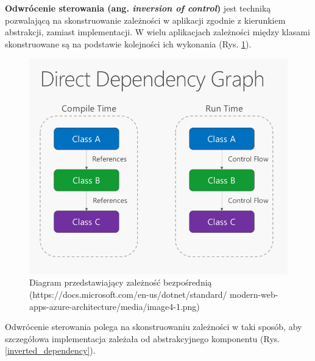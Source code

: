 \textbf{Odwrócenie sterowania (ang. \textit{inversion of control})} jest techniką pozwalającą na skonstruowanie zależności w aplikacji zgodnie z kierunkiem abstrakcji, zamiast implementacji. W wielu aplikacjach zależności między klasami skonstruowane są na podstawie kolejności ich wykonania (Rys. \ref{direct_dependency}).
\begin{figure}[!ht]
	\begin{center}
		\includegraphics[width=6in]{img/diagram/direct_dependency.png}
		\caption{Diagram przedstawiający zależność bezpośrednią (https://docs.microsoft.com/en-us/dotnet/standard/ modern-web-apps-azure-architecture/media/image4-1.png)}
		\label{direct_dependency}
	\end{center}
\end{figure}
Odwrócenie sterowania polega na skonstruowaniu zależności w taki sposób, aby szczegółowa implementacja zależała od abstrakcyjnego komponentu (Rys. \ref{inverted_dependency}).\cite{inversionofcontrol}

